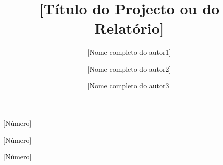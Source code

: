 \title{[Título do Projecto ou do Relatório]}

\author[f]{[Nome completo do autor1]}{[Número]}
\author[m]{[Nome completo do autor2]}{[Número]}
\author[m]{[Nome completo do autor3]}{[Número]}



